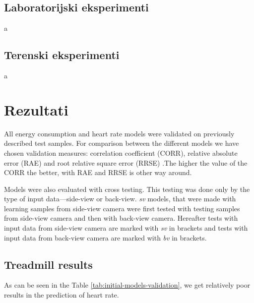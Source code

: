 \subsection{Laboratorijski eksperimenti}
a

\subsection{Terenski eksperimenti}
a

\section{Rezultati}
All energy consumption and heart rate models were validated on previously described test samples. For comparison between the different models we have chosen validation measures: correlation coefficient (CORR), relative absolute error (RAE) and root relative square error (RRSE) \cite{witten2005data}.The higher the value of the CORR the better, with RAE and RRSE is other way around.

Models were also evaluated with cross testing. This testing was done only by the type of input data---side-view or back-view. \textit{sv} models, that were made with learning samples from side-view camera were first tested with testing samples from side-view camera and then with back-view camera. Hereafter tests with input data from side-view camera are marked with \textit{sv} in brackets and tests with input data from back-view camera are marked with \textit{bv} in brackets.

\subsection{Treadmill results}\label{sec:initial-models}
As can be seen in the Table \ref{tab:initial-models-validation}, we get relatively poor results in the prediction of heart rate.

